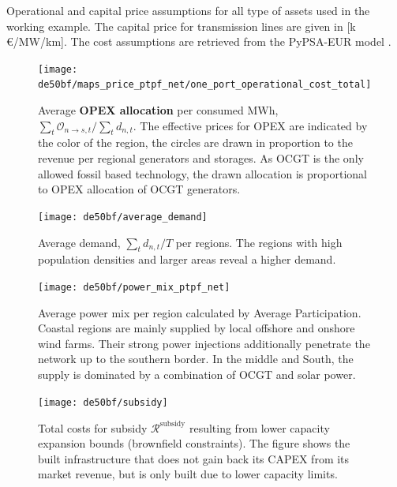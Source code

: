 \documentclass[11pt,twocolumn]{article}
\newcommand{\demand}[1][n]{d_{#1,t}}
\newcommand{\opex}{\mathcal{O}}
\newcommand{\remainingcost}{\mathcal{R}}
\newcommand{\subsidycost}{\remainingcost^\text{subsidy}}
\newcommand{\allocateopex}[1][n \rightarrow s]{\opex_{#1,t}}
\begin{document}
\begin{table}[h]
    \centering
        
    \caption{Operational and capital price assumptions for all type of assets used in the working example. The capital price for transmission lines are given in [k\,\euro/MW/km]. The cost assumptions are retrieved from the PyPSA-EUR model \cite{horsch_jonas_pypsa-eur_2020}.}
    \label{tab:cost_assumptions}
\end{table} 

\begin{figure}
    \texttt{[image: de50bf/maps\_price\_ptpf\_net/one\_port\_operational\_cost\_total]}
    \caption{Average \textbf{OPEX allocation} per consumed MWh, $\sum_t \allocateopex/\sum_t \demand$. The effective prices for OPEX are indicated by the color of the region, the circles are drawn in proportion to the revenue per regional generators and storages. As OCGT is the only allowed fossil based technology, the drawn allocation is proportional to OPEX allocation of OCGT generators.}
    \label{fig:opex_price}
\end{figure}


\begin{figure}
    \texttt{[image: de50bf/average\_demand]}
    \caption{Average demand, $\sum_t \demand/T$ per regions. The regions with high population densities and larger areas reveal a higher demand.}
    \label{fig:average_demand}
\end{figure}


\begin{figure}
    \texttt{[image: de50bf/power\_mix\_ptpf\_net]}
    \caption{Average power mix per region calculated by Average Participation. Coastal regions are mainly supplied by local offshore and onshore wind farms. Their strong power injections additionally penetrate the network up to the southern border. In the middle and South, the supply is dominated by a combination of OCGT and solar power.}
    \label{fig:power_mix}
\end{figure}

\begin{figure}
    \vspace{2cm}
    \texttt{[image: de50bf/subsidy]}
    \caption{Total costs for subsidy $\subsidycost$ resulting from lower capacity expansion bounds (brownfield constraints). The figure shows the built infrastructure that does not gain back its CAPEX from its market revenue, but is only built due to lower capacity limits.}
    \label{fig:subsidy}
\end{figure}
\end{document}
